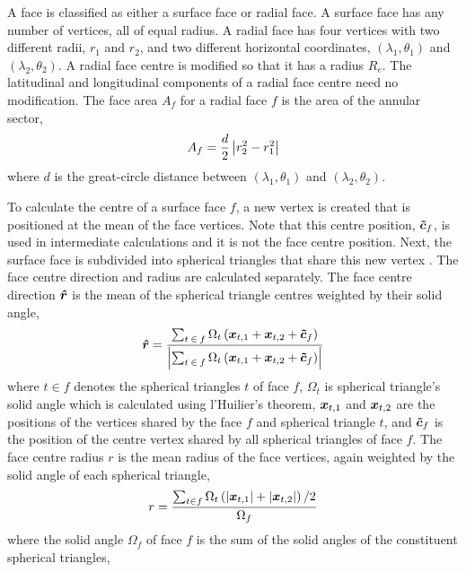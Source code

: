 A face is classified as either a surface face or radial face.
A surface face has any number of vertices, all of equal radius.
A radial face has four vertices with two different radii, $r_1$ and $r_2$, and two different horizontal coordinates, $(\lambda_1, \theta_1)$ and $(\lambda_2, \theta_2)$.
A radial face centre is modified so that it has a radius $R_e$.  The latitudinal and longitudinal components of a radial face centre need no modification.
The face area $A_f$ for a radial face $f$ is the area of the annular sector,
\begin{align}
	A_f = \frac{d}{2} \left\lvert r_2^2 - r_1^2 \right\rvert
\end{align}
where $d$ is the great-circle distance between $(\lambda_1, \theta_1)$ and $(\lambda_2, \theta_2)$.

To calculate the centre of a surface face $f$, a new vertex is created that is positioned at the mean of the face vertices.  Note that this centre position, $\bm{\tilde{c}}_f$, is used in intermediate calculations and it is not the face centre position.
Next, the surface face is subdivided into spherical triangles that share this new vertex \citep{vanbrummelen2013}.
The face centre direction and radius are calculated separately.  The face centre direction $\bm{\hat{r}}$ is the mean of the spherical triangle centres weighted by their solid angle,
\begin{align}
	\bm{\hat{r}} = \frac
	{\sum_{t\:\in\:f}{\Omega_t \left(\bm{x}_{t,1} + \bm{x}_{t,2} + \bm{\tilde{c}}_f \right)}}
	{\left\lvert \sum_{t\:\in\:f}{\Omega_t \left(\bm{x}_{t,1} + \bm{x}_{t,2} + \bm{\tilde{c}}_f \right)} \right\rvert} \label{eqn:spherical:face-centre-dir}
\end{align}
where $t\in f$ denotes the spherical triangles $t$ of face $f$, $\Omega_t$ is spherical triangle's solid angle which is calculated using l'Huilier's theorem, $\bm{x}_{t,1}$ and $\bm{x}_{t,2}$ are the positions of the vertices shared by the face $f$ and spherical triangle $t$, and $\bm{\tilde{c}}_f$ is the position of the centre vertex shared by all spherical triangles of face $f$.
The face centre radius $r$ is the mean radius of the face vertices, again weighted by the solid angle of each spherical triangle,
\begin{align}
	r = \frac
	{\sum_{t\in f}{\Omega_t \left(\left\lvert \bm{x}_{t,1} \right\rvert + \left\lvert \bm{x}_{t,2} \right\rvert \right)/2}}
	{\Omega_f} \label{eqn:spherical:face-centre-mag}
\end{align}
where the solid angle $\Omega_f$ of face $f$ is the sum of the solid angles of the constituent spherical triangles,
